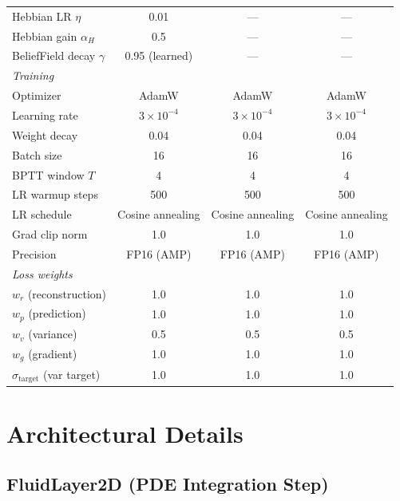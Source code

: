 \documentclass{article}
\begin{document}
\begin{table}[h]
\begin{tabular}{lccc}
        Hebbian LR $\eta$ & 0.01 & --- & --- \\
        Hebbian gain $\alpha_H$ & 0.5 & --- & --- \\
        BeliefField decay $\gamma$ & 0.95 (learned) & --- & --- \\
        \midrule
        \multicolumn{4}{l}{\emph{Training}} \\
        Optimizer & AdamW & AdamW & AdamW \\
        Learning rate & $3 \times 10^{-4}$ & $3 \times 10^{-4}$ & $3 \times 10^{-4}$ \\
        Weight decay & 0.04 & 0.04 & 0.04 \\
        Batch size & 16 & 16 & 16 \\
        BPTT window $T$ & 4 & 4 & 4 \\
        LR warmup steps & 500 & 500 & 500 \\
        LR schedule & Cosine annealing & Cosine annealing & Cosine annealing \\
        Grad clip norm & 1.0 & 1.0 & 1.0 \\
        Precision & FP16 (AMP) & FP16 (AMP) & FP16 (AMP) \\
        \midrule
        \multicolumn{4}{l}{\emph{Loss weights}} \\
        $w_r$ (reconstruction) & 1.0 & 1.0 & 1.0 \\
        $w_p$ (prediction) & 1.0 & 1.0 & 1.0 \\
        $w_v$ (variance) & 0.5 & 0.5 & 0.5 \\
        $w_g$ (gradient) & 1.0 & 1.0 & 1.0 \\
        $\sigma_{\text{target}}$ (var target) & 1.0 & 1.0 & 1.0 \\
        \bottomrule
    \end{tabular}
\end{table}

\section{Architectural Details}
\label{app:architecture}

\subsection{FluidLayer2D (PDE Integration Step)}
\end{document}

